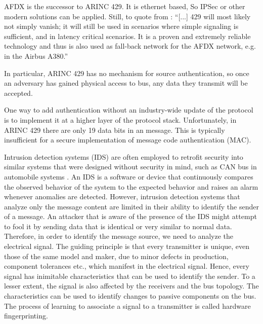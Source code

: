 \documentclass[conference]{IEEEtran}
\begin{document}
  AFDX is the successor to ARINC 429. It is ethernet based, So IPSec or other modern solutions can be applied. Still, to quote from \cite{fuchs2012evolution}: ``[...] 429 will most likely not simply vanish; it will still be used in scenarios where simple signaling is sufficient, and in latency critical scenarios. It is a proven and extremely reliable technology and thus is also used as fall-back network for the AFDX network, e.g. in the Airbus A380.''
  
  In particular, ARINC 429 has no mechanism for source authentication, so once an adversary has gained physical access to bus, any data they transmit will be accepted.
   
  One way to add authentication without an industry-wide update of the protocol is to implement it at a higher layer of the protocol stack. Unfortunately, in ARINC 429 there are only 19 data bits in an message. This is typically insufficient for a secure implementation of message code authentication (MAC).
  
  Intrusion detection systems (IDS) are often employed to retrofit security into similar systems that were designed without security in mind, such as CAN bus in automobile systems \cite{muter2011entropy}. An IDS is a software or device that continuously compares the observed behavior of the system to the expected behavior and raises an alarm whenever anomalies are detected. However, intrusion detection systems that analyze only the message content are limited in their ability to identify the sender of a message.  An attacker that is aware of the presence of the IDS might attempt to fool it by sending data that is identical or very similar to normal data.  Therefore, in order to identify the message source, we need to analyze the electrical signal. The guiding principle is that every transmitter is unique, even those of the same model and maker, due to minor defects in production, component tolerances etc., which manifest in the electrical signal. Hence, every signal has inimitable characteristics that can be used to identify the sender. To a lesser extent, the signal is also affected by the receivers and the bus topology. The characteristics can be used to identify changes to passive components on the bus. The process of learning to associate a signal to a transmitter is called hardware fingerprinting.
  
\end{document}

